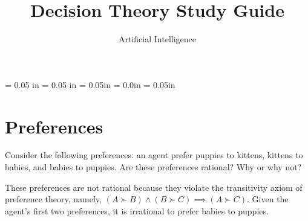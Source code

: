 
\usepackage{verbatim, multicol, tabularx,hyperref, tikz, enumitem}
\usepackage{amsmath,amsthm, amssymb, stmaryrd, latexsym, bm, listings, qtree}
\usepackage[margin=1in]{geometry}


\hypersetup{colorlinks=true,urlcolor=blue}

\headheight = 0.05 in
\headsep = 0.05 in
\parskip = 0.05in
\parindent = 0.0in
\floatsep = 0.05in

\DeclareMathOperator*{\argmin}{arg\!min}
\DeclareMathOperator*{\argmax}{arg\!max}

\title{Decision Theory Study Guide}
\author{Artificial Intelligence}
\date{}


\maketitle

\setcounter{section}{0} %
\section{Preferences}

\begin{questions}

\question Consider the following preferences: an agent prefer puppies to kittens, kittens to babies, and babies to puppies.  Are these preferences rational?  Why or why not?

\begin{solution}[1in]
These preferences are not rational because they violate the transitivity axiom of preference theory, namely, $(A \succ B) \land (B \succ C) \implies (A \succ C)$.  Given the agent's first two preferences, it is irrational to prefer babies to puppies.
\end{solution}

\end{questions}

